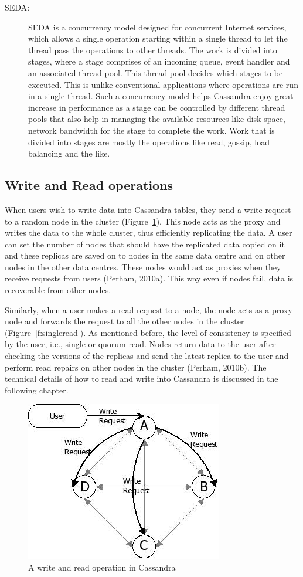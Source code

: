 \begin{description}
  
  \item [\ac{SEDA}:] \ac{SEDA} is a concurrency model designed for concurrent
  Internet services, which allows a single operation starting within a single
  thread to let the thread pass the operations to other threads. The work is
  divided into stages, where a stage comprises of an incoming queue, event
  handler and an associated thread pool. This thread pool decides which stages
  to be executed. This is unlike conventional applications where operations are
  run in a single thread. Such a concurrency model helps Cassandra enjoy great
  increase in performance as a stage can be
  controlled by different thread pools that also help in managing the available
  resources like disk space, network bandwidth for the stage to complete the
  work. Work that is divided into stages are mostly the operations like read,
  gossip, load balancing and the like.
  
\end{description}
\subsection{ Write and Read operations}
When users wish to write data into Cassandra tables, they send a write request
to a random node in the cluster (Figure~\ref{f:writeRead}). This node acts as the proxy
and writes the data to the whole cluster, thus efficiently replicating the data.
A user can set the number of nodes that should have the
replicated data copied on it and these replicas are saved on to nodes in the
same data centre and on other nodes in the other data centres. These nodes would act
as proxies when they receive requests from users (Perham, 2010a). This way even
if nodes fail, data is recoverable from other nodes.
		

Similarly, when a user makes a read request to a node, the node acts as a proxy
node and forwards the request to all the other nodes in the cluster
(Figure~\ref{f:singleread}).
As mentioned before, the level of consistency is specified by the user, i.e.,
single or quorum read. Nodes return data to the user after checking the versions
of the replicas and send the latest replica to the user and perform read repairs
on other nodes in the cluster (Perham, 2010b).
The technical details of how to read and write into Cassandra is discussed in
the following chapter.

\begin{figure}[H]
			\centering
			\includegraphics[width=.45\textwidth]{./figure/Cassandra/Write-Request-Cassandra.png}
						\caption{A write and read operation in Cassandra}\label{f:writeRead}
		\end{figure}
